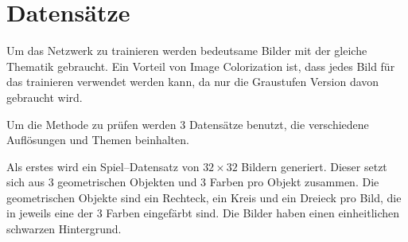 \section{Datensätze}
Um das Netzwerk zu trainieren werden bedeutsame Bilder mit der gleiche Thematik gebraucht. 
Ein Vorteil von Image Colorization ist, dass jedes Bild für das trainieren
verwendet werden kann, da nur die Graustufen Version davon gebraucht wird.

Um die Methode zu prüfen werden 3 Datensätze benutzt, die verschiedene Auflösungen und Themen beinhalten.

Als erstes wird ein Spiel–Datensatz von $ 32 \times 32 $ Bildern generiert. Dieser setzt sich aus 3 geometrischen Objekten und 3 Farben pro
Objekt zusammen. Die geometrischen Objekte sind ein Rechteck, ein Kreis und ein Dreieck pro Bild, die in jeweils eine der 3 Farben eingefärbt sind.
Die Bilder haben einen einheitlichen schwarzen Hintergrund.

